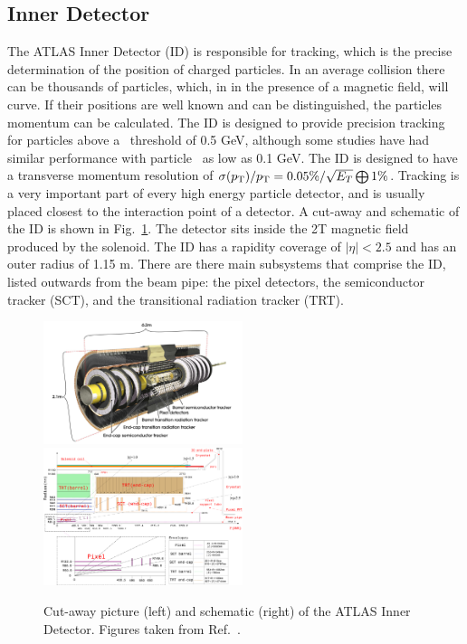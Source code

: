 \subsection{Inner Detector}

The ATLAS Inner Detector (ID) is responsible for tracking, which is the precise determination of the position of charged particles. In an average collision there can be thousands of particles, which, in in the presence of a magnetic field, will curve. If their positions are well known and can be distinguished, the particles momentum can be calculated. The ID is designed to provide precision tracking for particles above a \pt\ threshold of 0.5 GeV, although some studies have had similar performance with particle \pt\ as low as 0.1 GeV. The ID is designed to have a transverse momentum resolution of $\sigma(\mbox{$p_{\mathrm{T}}$})/\mbox{$p_{\mathrm{T}}$}=0.05\%/\sqrt{E_{T}}\bigoplus1\%$.  Tracking is a very important part of every high energy particle detector, and is usually placed closest to the interaction point of a detector. A cut-away and schematic of the ID is shown in Fig.~\ref{fig:id}. The detector sits inside the 2T magnetic field produced by the solenoid. The ID has a rapidity coverage of $|\eta|<2.5$ and has an outer radius of 1.15 m. There are there main subsystems that comprise the ID, listed outwards from the beam pipe: the pixel detectors, the semiconductor tracker (SCT), and the transitional radiation tracker (TRT).

\begin{figure}
	\centerline{
		\includegraphics[width=0.52\textwidth]{figures/id.pdf} %
		\includegraphics[width=0.52\textwidth]{figures/id_schematic.pdf} %
	}
	\caption{ Cut-away picture (left) and schematic (right) of the ATLAS Inner Detector. Figures taken from Ref.~\cite{Aad:2008zzm}.}	
	\label{fig:id}
\end{figure}

